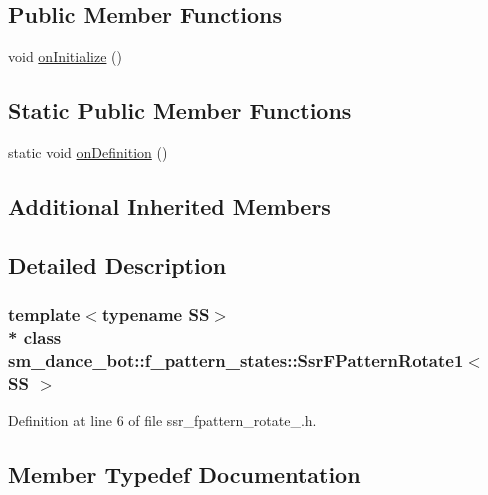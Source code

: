 \subsection*{Public Member Functions}
\begin{DoxyCompactItemize}
\item 
void \hyperlink{structsm__dance__bot_1_1f__pattern__states_1_1SsrFPatternRotate1_a5cd42c7ac026a2a24ea939aa35a2204e}{on\+Initialize} ()
\end{DoxyCompactItemize}
\subsection*{Static Public Member Functions}
\begin{DoxyCompactItemize}
\item 
static void \hyperlink{structsm__dance__bot_1_1f__pattern__states_1_1SsrFPatternRotate1_aa87ad011530c3ce8d1c164f1636a50cf}{on\+Definition} ()
\end{DoxyCompactItemize}
\subsection*{Additional Inherited Members}


\subsection{Detailed Description}
\subsubsection*{template$<$typename SS$>$\\*
class sm\+\_\+dance\+\_\+bot\+::f\+\_\+pattern\+\_\+states\+::\+Ssr\+F\+Pattern\+Rotate1$<$ S\+S $>$}



Definition at line 6 of file ssr\+\_\+fpattern\+\_\+rotate\+\_.\+h.



\subsection{Member Typedef Documentation}
